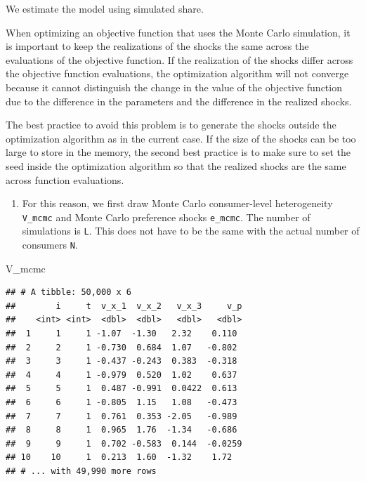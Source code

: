 \documentclass[]{book}
\newenvironment{Shaded}{\begin{snugshade}}{\end{snugshade}}
\newcommand{\NormalTok}[1]{#1}
\providecommand{\tightlist}{%
  \setlength{\itemsep}{0pt}\setlength{\parskip}{0pt}}
\begin{document}
We estimate the model using simulated share.

When optimizing an objective function that uses the Monte Carlo
simulation, it is important to keep the realizations of the shocks the
same across the evaluations of the objective function. If the
realization of the shocks differ across the objective function
evaluations, the optimization algorithm will not converge because it
cannot distinguish the change in the value of the objective function due
to the difference in the parameters and the difference in the realized
shocks.

The best practice to avoid this problem is to generate the shocks
outside the optimization algorithm as in the current case. If the size
of the shocks can be too large to store in the memory, the second best
practice is to make sure to set the seed inside the optimization
algorithm so that the realized shocks are the same across function
evaluations.

\begin{enumerate}
\def\labelenumi{\arabic{enumi}.}
\setcounter{enumi}{1}
\tightlist
\item
  For this reason, we first draw Monte Carlo consumer-level
  heterogeneity \texttt{V\_mcmc} and Monte Carlo preference shocks
  \texttt{e\_mcmc}. The number of simulations is \texttt{L}. This does
  not have to be the same with the actual number of consumers
  \texttt{N}.
\end{enumerate}

\begin{Shaded}
\begin{Highlighting}[]
\NormalTok{V_mcmc}
\end{Highlighting}
\end{Shaded}

\begin{verbatim}
## # A tibble: 50,000 x 6
##        i     t  v_x_1  v_x_2   v_x_3     v_p
##    <int> <int>  <dbl>  <dbl>   <dbl>   <dbl>
##  1     1     1 -1.07  -1.30   2.32    0.110 
##  2     2     1 -0.730  0.684  1.07   -0.802 
##  3     3     1 -0.437 -0.243  0.383  -0.318 
##  4     4     1 -0.979  0.520  1.02    0.637 
##  5     5     1  0.487 -0.991  0.0422  0.613 
##  6     6     1 -0.805  1.15   1.08   -0.473 
##  7     7     1  0.761  0.353 -2.05   -0.989 
##  8     8     1  0.965  1.76  -1.34   -0.686 
##  9     9     1  0.702 -0.583  0.144  -0.0259
## 10    10     1  0.213  1.60  -1.32    1.72  
## # ... with 49,990 more rows
\end{verbatim}
\end{document}
